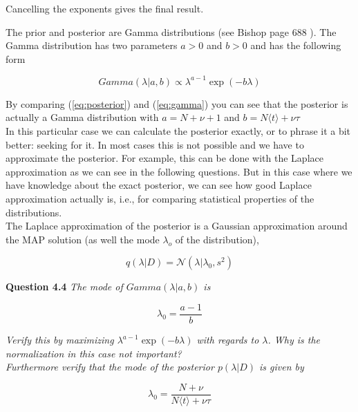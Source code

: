 \documentclass[a4paper]{article}
\begin{document}
Cancelling the exponents gives the final result.\\

\vspace{2em}

The prior and posterior are Gamma distributions (see Bishop page 688 ). The Gamma distribution has two parameters $a > 0$ and $b > 0$ and has the following form

\begin{equation}
\label{eq:gamma}
	Gamma(\lambda | a, b) \propto \lambda^{a-1} \exp(-b \lambda)
\end{equation}

By comparing (\ref{eq:posterior}) and (\ref{eq:gamma}) you can see that the posterior is actually a Gamma distribution with $a = N + \nu + 1$ and $b = N \langle t \rangle + \nu \tau$\\

In this particular case we can calculate the posterior exactly, or to phrase it a bit better: seeking for it. In most cases this is not possible and we have to approximate the posterior. For example, this can be done with the Laplace approximation as we can see in the following questions. But in this case where we have knowledge about the exact posterior, we can see how good Laplace approximation actually is, i.e., for comparing statistical properties of the distributions.\\
The Laplace approximation of the posterior is a Gaussian approximation around the MAP solution (as well the mode $\lambda_o$ of the distribution), 

\begin{equation}
	q(\lambda | D) = \mathcal{N}(\lambda | \lambda_0, s^2)
\end{equation}

\textbf{Question 4.4}  \textit{The mode of $Gamma(\lambda | a, b)$ is}

\begin{equation}
	\lambda_0 = \frac{a - 1}{b}
\end{equation}

\textit{Verify this by maximizing $\lambda^{a-1} \exp(-b \lambda)$ with regards to $\lambda$. Why is the normalization in this case not important?\\ Furthermore verify that the mode of the posterior $p(\lambda | D)$ is given by}

\begin{equation}
	\lambda_0 = \frac{N + \nu}{N \langle t \rangle + \nu \tau}
\end{equation}
\end{document}
